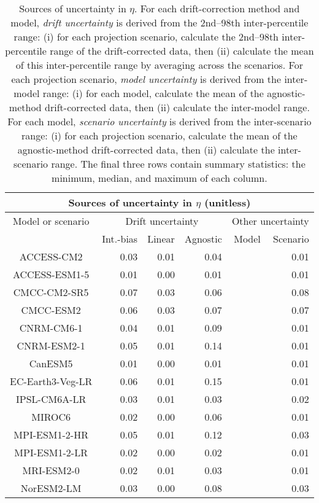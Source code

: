 \begin{table*}[t]
\centering
\caption{Sources of uncertainty in $\eta$. For each drift-correction method and model, \emph{drift uncertainty} is derived from the 2nd--98th inter-percentile range: (i) for each projection scenario, calculate the 2nd--98th inter-percentile range of the drift-corrected data, then (ii) calculate the mean of this inter-percentile range by averaging across the scenarios. For each projection scenario, \emph{model uncertainty} is derived from the inter-model range: (i) for each model, calculate the mean of the agnostic-method drift-corrected data, then (ii) calculate the inter-model range. For each model, \emph{scenario uncertainty} is derived from the inter-scenario range: (i) for each projection scenario, calculate the mean of the agnostic-method drift-corrected data, then (ii) calculate the inter-scenario range. The final three rows contain summary statistics: the minimum, median, and maximum of each column.}
\begin{tabular}{c|rrr|rr}
\toprule
\multicolumn{6}{c}{Sources of uncertainty in $\eta$ (unitless)} \\ 
\midrule
Model or scenario & \multicolumn{3}{c|}{Drift uncertainty} & \multicolumn{2}{c}{Other uncertainty} \\
 & Int.-bias & Linear & Agnostic & Model & Scenario \\
\midrule
ACCESS-CM2 & 0.03 & 0.01 & 0.04 &  & 0.01 \\
ACCESS-ESM1-5 & 0.01 & 0.00 & 0.01 &  & 0.01 \\
CMCC-CM2-SR5 & 0.07 & 0.03 & 0.06 &  & 0.08 \\
CMCC-ESM2 & 0.06 & 0.03 & 0.07 &  & 0.07 \\
CNRM-CM6-1 & 0.04 & 0.01 & 0.09 &  & 0.01 \\
CNRM-ESM2-1 & 0.05 & 0.01 & 0.14 &  & 0.01 \\
CanESM5 & 0.01 & 0.00 & 0.01 &  & 0.01 \\
EC-Earth3-Veg-LR & 0.06 & 0.01 & 0.15 &  & 0.01 \\
IPSL-CM6A-LR & 0.03 & 0.01 & 0.03 &  & 0.02 \\
MIROC6 & 0.02 & 0.00 & 0.06 &  & 0.01 \\
MPI-ESM1-2-HR & 0.05 & 0.01 & 0.12 &  & 0.03 \\
MPI-ESM1-2-LR & 0.02 & 0.00 & 0.02 &  & 0.01 \\
MRI-ESM2-0 & 0.02 & 0.01 & 0.03 &  & 0.01 \\
NorESM2-LM & 0.03 & 0.00 & 0.08 &  & 0.03 \\

\end{tabular}
\end{table*}
